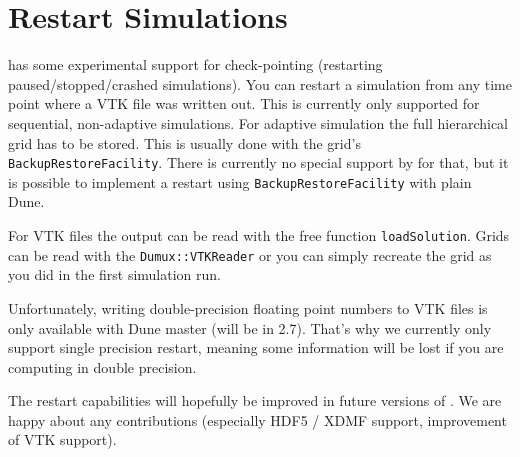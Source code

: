 \section{Restart \Dumux Simulations}
\label{sc_restartsimulations}

\Dumux has some experimental support for check-pointing (restarting paused/stopped/crashed simulations).
You can restart a \Dumux simulation from any time point where a VTK file was written out.
This is currently only supported for sequential, non-adaptive simulations. For adaptive simulation
the full hierarchical grid has to be stored. This is usually done with the grid's \texttt{BackupRestoreFacility}.
There is currently no special support by \Dumux for that, but it is possible to implement
a restart using \texttt{BackupRestoreFacility} with plain Dune.

For VTK files the output can be read with the free function \texttt{loadSolution}. Grids can be read with
the \texttt{Dumux::VTKReader} or you can simply recreate the grid as you did in the first simulation run.

Unfortunately, writing double-precision floating point numbers to VTK files is only available with Dune master (will be in 2.7).
That's why we currently only support single precision restart, meaning some information will be lost if you are computing
in double precision.

The restart capabilities will hopefully be improved in future versions of .
We are happy about any contributions (especially HDF5 / XDMF support, improvement of VTK support).
